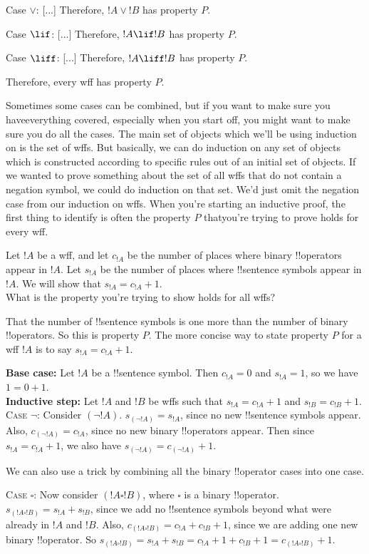 \documentclass[../../include/open-logic-section]{subfiles}
\begin{document}
\begin{explain}
Case $\lor$: [...] Therefore, $!A \lor !B$ has property $P$.

Case $\lif$: [...] Therefore, $!A \lif !B$ has property $P$.

Case $\liff$: [...] Therefore, $!A \liff !B$ has
property $P$.

Therefore, every wff has property $P$.

Sometimes some cases can be combined, but if you want to make sure you
haveeverything covered, especially when you start off, you might want to
make
sure you do all the cases. The main set of objects which we'll be using
induction on is the set of wffs. But basically, we can do induction on any
set of objects which is constructed according to specific rules out of an
initial set of objects.
If we wanted to prove something about the set of all wffs that do not
contain a negation symbol, we could do induction on that set. We'd just
omit the negation case from our induction on wffs. When you're starting an
inductive proof, the first thing to identify is often the property $P$
thatyou're trying to prove holds for every wff.
\end{explain}

\begin{ex}
Let $!A$ be a wff, and let $c_{!A}$ be the number of
    places where binary !!{operator}s appear in $!A$. Let
    $s_{!A}$ be the number of places where !!{sentence} symbols appear
in $!A$. We will show that $s_{!A} = c_{!A} + 1$.\\

What is the property you're trying to show holds for all wffs?

That the number of !!{sentence} symbols is one more than the number of
binary !!{operator}s. So this is property $P$. The more concise way to
state property $P$ for a wff $!A$ is to say $s_{!A} = c_{!A} + 1$.

\textbf{Base case:} Let $!A$ be a !!{sentence} symbol. Then $c_{!A} = 0$
and $s_{!A} = 1$, so we have $1 = 0 + 1$.\\
\textbf{Inductive step:} Let $!A$ and $!B$ be wffs such that
$s_{!A}
= c_{!A} + 1$ and $s_{!B} = c_{!B} + 1$.\\
\textsc{Case $\lnot$:} Consider $(\lnot !A)$. $s_{(\lnot !A)} =
s_{!A}$, since no new !!{sentence} symbols appear. Also, $c_{(\lnot !A)} =
c_{!A}$, since no new binary !!{operator}s appear. Then since $s_{!A} =
c_{!A} + 1$, we also have $s_{(\lnot !A)} = c_{(\lnot !A)} +
1$.

We can also use a trick by combining all the binary !!{operator} cases
into one case.

\textsc{Case $\square$:} Now consider $(!A \square !B)$, where
$\square$ is a binary !!{operator}. $s_{(!A \square !B)} = s_{!A} +
s_{!B}$, since we add no !!{sentence} symbols beyond what were already in
$!A$ and $!B$. Also, $c_{(!A \square !B)} = c_{!A} +
c_{!B} + 1$, since we are adding one new binary !!{operator}. So $s_{(!A
\square !B)} = s_{!A} + s_{!B} = c_{!A} + 1 + c_{!B} + 1 =
c_{(!A \square !B)} + 1$.
\end{ex}
\end{document}
